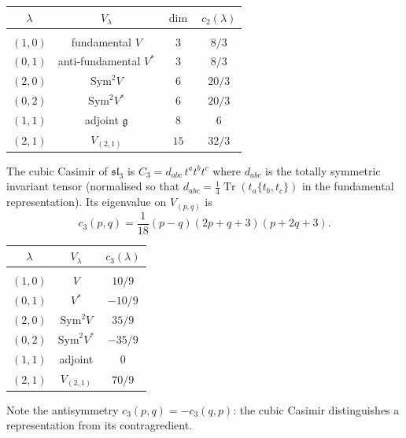 \documentclass[11pt]{article}
\newcommand{\fg}{\mathfrak{g}}
\newcommand{\fsl}{\mathfrak{sl}}
\newcommand{\Tr}{\operatorname{Tr}}
\begin{document}
\begin{observation}
\label{obs:sl3-casimir-table}
\begin{center}
\begin{tabular}{cccc}
  $\lambda$ & $V_\lambda$ & $\dim$ & $c_2(\lambda)$\\[2pt]
  \hline\\[-8pt]
  $(1,0)$ & fundamental $V$ & $3$ & $8/3$\\
  $(0,1)$ & anti-fundamental $V^*$ & $3$ & $8/3$\\
  $(2,0)$ & $\mathrm{Sym}^2 V$ & $6$ & $20/3$\\
  $(0,2)$ & $\mathrm{Sym}^2 V^*$ & $6$ & $20/3$\\
  $(1,1)$ & adjoint $\fg$ & $8$ & $6$\\
  $(2,1)$ & $V_{(2,1)}$ & $15$ & $32/3$\\
\end{tabular}
\end{center}
\end{observation}

The cubic Casimir of $\fsl_3$ is
$C_3 = d_{abc}\, t^a t^b t^c$ where $d_{abc}$ is the totally symmetric
invariant tensor (normalised so that $d_{abc} = \frac{1}{4}\Tr(t_a\{t_b, t_c\})$
in the fundamental representation).
Its eigenvalue on $V_{(p,q)}$ is
\begin{equation}\label{eq:cubic-casimir}
  c_3(p,q)
  = \frac{1}{18}(p - q)(2p + q + 3)(p + 2q + 3).
\end{equation}

\begin{observation}
\label{obs:sl3-cubic-table}
\begin{center}
\begin{tabular}{ccc}
  $\lambda$ & $V_\lambda$ & $c_3(\lambda)$ \\[2pt]
  \hline\\[-8pt]
  $(1,0)$ & $V$ & $10/9$ \\
  $(0,1)$ & $V^*$ & $-10/9$ \\
  $(2,0)$ & $\mathrm{Sym}^2 V$ & $35/9$ \\
  $(0,2)$ & $\mathrm{Sym}^2 V^*$ & $-35/9$ \\
  $(1,1)$ & adjoint & $0$\\
  $(2,1)$ & $V_{(2,1)}$ & $70/9$ \\
\end{tabular}
\end{center}
Note the antisymmetry $c_3(p,q) = -c_3(q,p)$: the cubic
Casimir distinguishes a representation from its contragredient.
\end{observation}
\end{document}
